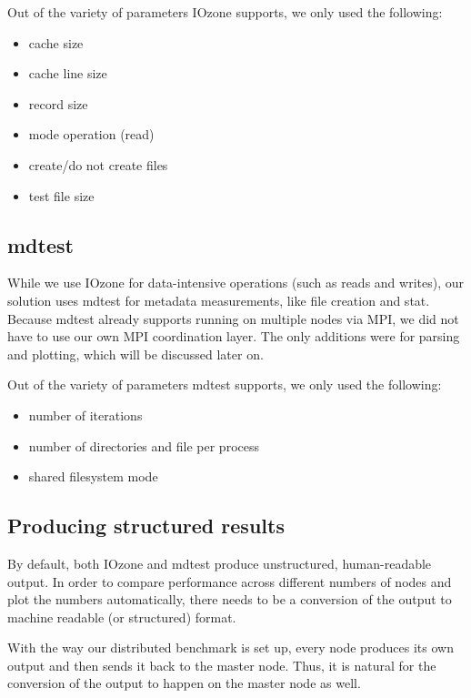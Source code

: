 Out of the variety of parameters IOzone supports, we only used the following:

\begin{itemize}

\item cache size
\item cache line size
\item record size
\item mode operation (read)
\item create/do not create files
\item test file size

\end{itemize}



\subsection{mdtest}

While we use IOzone for data-intensive operations (such as reads and writes), our solution uses mdtest for metadata measurements, like file creation and stat. Because mdtest already supports running on multiple nodes via MPI, we did not have to use our own MPI coordination layer. The only additions were for parsing and plotting, which will be discussed later on.

Out of the variety of parameters mdtest supports, we only used the following:

\begin{itemize}

\item number of iterations
\item number of directories and file per process
\item shared filesystem mode

\end{itemize}




\subsection{Producing structured results}

By default, both IOzone and mdtest produce unstructured, human-readable output. In order to compare performance across different numbers of nodes and plot the numbers automatically, there needs to be a conversion of the output to machine readable (or structured) format.

With the way our distributed benchmark is set up, every node produces its own output and then sends it back to the master node. Thus, it is natural for the conversion of the output to happen on the master node as well.



